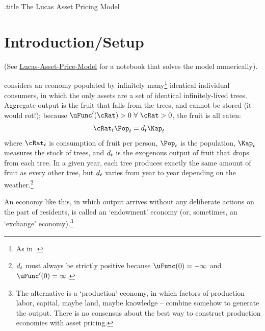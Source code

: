 \documentclass{\handout}
\begin{document}
\handoutHeader

\begin{verbatimwrite}{\jobname.title}
The Lucas Asset Pricing Model
\end{verbatimwrite}

\handoutNameMake

\hypertarget{introduction-setup}{}
\section{Introduction/Setup}

(See \href{https://econ-ark.org/materials/lucas-asset-price-model?launch}{Lucas-Asset-Price-Model} for a notebook that solves the model numerically).

\cite{lucas:assetpricing} considers an economy populated by infinitely many\footnote{As in \Aggregation.}  identical individual consumers, in which the only assets are a set of identical infinitely-lived trees.  Aggregate output is the fruit that falls from the trees, and cannot be stored (it would rot!); because $\uFunc^{\prime}(\cRat)>0~\forall~\cRat > 0$, the fruit is all eaten:
\begin{equation}\begin{gathered}\begin{aligned}
\cRat_{t}\Pop_{t} & =  \dvdnd_{t}\Kap_{t} \label{eq:CeqY}
\end{aligned}\end{gathered}\end{equation}
where $\cRat_{t}$ is consumption of fruit per person, $\Pop_{t}$ is the population, $\Kap_{t}$ measures the stock of trees, and $d_{t}$ is the exogenous output of fruit that \textit{d}rops from each tree.  In a given year, each tree produces exactly the same amount of fruit as every other tree, but $d_{t}$ varies from year to year depending on the weather.\footnote{$d_{t}$ must always be strictly positive because $\uFunc(0) = -\infty$ and $\uFunc^{\prime}(0)=\infty$.}

An economy like this, in which output arrives without any deliberate actions on the part of residents, is called an `endowment' economy (or, sometimes, an `exchange' economy).\footnote{The alternative is a `production' economy, in which factors of production -- labor, capital, maybe land, maybe knowledge -- combine somehow to generate the output.  There is no consensus about the best way to construct production economies with asset pricing.}   
\end{document}
